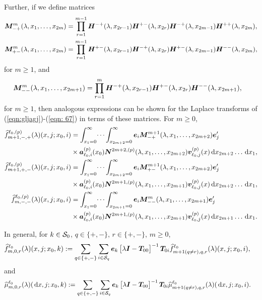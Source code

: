 Further, if we define matrices
\begin{align*}
	\boldsymbol M^{m}_{-+}(\lambda,x_1,\dots,x_{2m}) &= \prod_{r=1}^{m-1}\boldsymbol H^{-+}(\lambda,x_{2r-1})\boldsymbol H^{+-}(\lambda,x_{2r}) \boldsymbol H^{-+}(\lambda,x_{2m-1}) \boldsymbol H^{++}(\lambda,x_{2m}),
	\\\boldsymbol M^{m}_{+-}(\lambda,x_1,\dots,x_{2m}) &= \prod_{r=1}^{m-1}\boldsymbol H^{+-}(\lambda,x_{2r-1})\boldsymbol H^{-+}(\lambda,x_{2r}) \boldsymbol H^{+-}(\lambda,x_{2m-1}) \boldsymbol H^{--}(\lambda,x_{2m}),
\end{align*}
for \(m\geq 1\), and
\begin{align*}
	&\boldsymbol M^{m}_{--}(\lambda,x_1,\dots,x_{2m+1}) \nonumber 
	= \prod_{r=1}^{m}\boldsymbol H^{-+}(\lambda,x_{2r-1})\boldsymbol H^{+-}(\lambda,x_{2r}) 
	\boldsymbol H^{--}(\lambda,x_{2m+1}),\nonumber 
\end{align*}
for \(m\geq 1\), then analogous expressions can be shown for the Laplace transforms of (\ref{eqn:gljagj})-(\ref{eqn: 67}) in terms of these matrices. For \(m\geq 0\), 
\begin{align*}
	\widehat f^{\ell_0,(p)}_{m+1,-,+}(\lambda)(x, j; x_0,i) &= 
		\int_{x_1=0}^\infty \dots \int_{x_{2m+2}=0}^\infty \boldsymbol e_i\boldsymbol M^{m+1}_{-+}(\lambda,x_1,\dots,x_{2m+2})\boldsymbol e_j'{} \nonumber 
		\\&\times \boldsymbol a_{\ell_0,i}^{(p)}(x_0) \boldsymbol N^{2m+2,(p)}(\lambda,x_1,\dots,x_{2m+2}) {\boldsymbol v}_{\ell_0,j}^{(p)}( x)\, \mathrm{d} x_{2m+2}\dots\, \mathrm{d} x_1,
	\\ \widehat f^{\ell_0,(p)}_{m+1,+,-}(\lambda)(x, j; x_0,i) &= 
		\int_{x_1=0}^\infty \dots \int_{x_{2m+2}=0}^\infty \boldsymbol e_i\boldsymbol M^{m+1}_{+-}(\lambda,x_1,\dots,x_{2m+2})\boldsymbol e_j'{} \nonumber 
		\\&\times \boldsymbol a_{\ell_0,i}^{(p)}(x_0) \boldsymbol N^{2m+1,(p)}(\lambda,x_1,\dots,x_{2m+1}) {\boldsymbol v}_{\ell_0,j}^{(p)}( x)\, \mathrm{d} x_{2m+2}\dots\, \mathrm{d} x_1,
	\\ \widehat f^{\ell_0,(p)}_{m,-,-}(\lambda)(x, j; x_0,i) &= 
		\int_{x_1=0}^\infty \dots \int_{x_{2m+1}=0}^\infty \boldsymbol e_i\boldsymbol M^m_{--}(\lambda,x_1,\dots,x_{2m+1})\boldsymbol e_j'{} \nonumber 
		\\&\times \boldsymbol a_{\ell_0,i}^{(p)}(x_0) \boldsymbol N^{2m+1,(p)}(\lambda,x_1,\dots,x_{2m+1}) {\boldsymbol v}_{\ell_0,j}^{(p)}( x)\, \mathrm{d} x_{2m+1}\dots\, \mathrm{d} x_1.
\end{align*}

In general, for \(k\in\mathcal{S}_0\), \(q\in \{+,-\}, \, r\in\{+,-\}\), \(m\geq 0\),
\begin{align}
	\widehat f_{m,0,r}^{\ell_0}(\lambda)(x,j;x_0,k)  
	&:= \sum_{q\in\{+,-\}}\sum_{i\in\mathcal{S}_q}\boldsymbol e_k\begin{bmatrix} \lambda \boldsymbol I - \boldsymbol T_{00} \end{bmatrix}^{-1}\boldsymbol T_{0i}\widehat f_{m+1(q\neq r),q,r}^{\ell_0}(\lambda)(x,j;x_0,i), \label{eqn: vma}
\end{align}
and
\begin{align}
	\widehat \mu_{m,0,r}^{\ell_0}(\lambda)(\, \mathrm{d} x,j;x_0,k) \label{eqn:kdneee}
	&:= \sum_{q\in\{+,-\}}\sum_{i\in\mathcal{S}_q}\boldsymbol e_k\begin{bmatrix} \lambda \boldsymbol I - \boldsymbol T_{00} \end{bmatrix}^{-1}\boldsymbol T_{0i}\widehat \mu_{m+1(q\neq r),q,r}^{\ell_0}(\lambda)(\, \mathrm{d} x,j;x_0,i).
\end{align}

